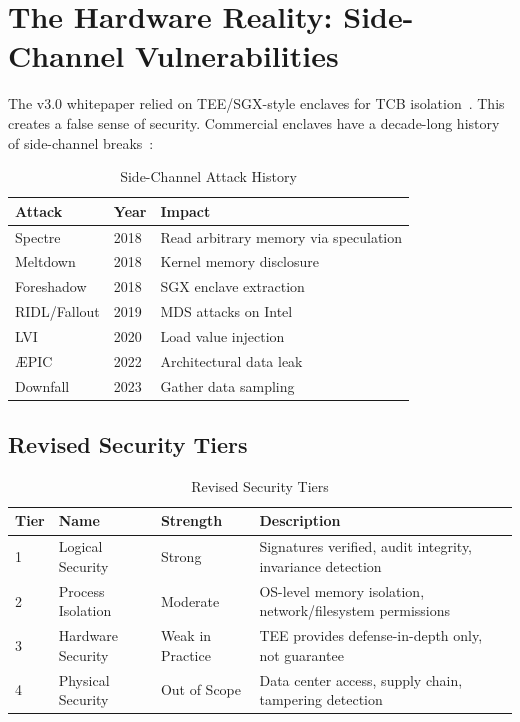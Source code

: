 \documentclass[11pt,letterpaper]{article}
\theoremstyle{definition}
\theoremstyle{remark}
\begin{document}
\section{The Hardware Reality: Side-Channel Vulnerabilities}

The v3.0 whitepaper relied on TEE/SGX-style enclaves for TCB isolation~\cite{costan2016}. This creates a false sense of security. Commercial enclaves have a decade-long history of side-channel breaks~\cite{kocher2019,lipp2018,vanbulck2018}:

\begin{table}[h]
\centering
\begin{tabular}{@{}lll@{}}
\toprule
\textbf{Attack} & \textbf{Year} & \textbf{Impact} \\
\midrule
Spectre~\cite{kocher2019} & 2018 & Read arbitrary memory via speculation \\
Meltdown~\cite{lipp2018} & 2018 & Kernel memory disclosure \\
Foreshadow~\cite{vanbulck2018} & 2018 & SGX enclave extraction \\
RIDL/Fallout & 2019 & MDS attacks on Intel \\
LVI & 2020 & Load value injection \\
\AE{}PIC & 2022 & Architectural data leak \\
Downfall & 2023 & Gather data sampling \\
\bottomrule
\end{tabular}
\caption{Side-Channel Attack History}
\end{table}

\subsection{Revised Security Tiers}

\begin{table}[h]
\centering
\begin{tabular}{@{}llll@{}}
\toprule
\textbf{Tier} & \textbf{Name} & \textbf{Strength} & \textbf{Description} \\
\midrule
1 & Logical Security & Strong & Signatures verified, audit integrity, invariance detection \\
2 & Process Isolation & Moderate & OS-level memory isolation, network/filesystem permissions \\
3 & Hardware Security & Weak in Practice & TEE provides defense-in-depth only, not guarantee \\
4 & Physical Security & Out of Scope & Data center access, supply chain, tampering detection \\
\bottomrule
\end{tabular}
\caption{Revised Security Tiers}
\end{table}
\end{document}
